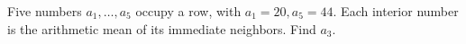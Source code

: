 Five numbers $a_1,\ldots,a_5$ occupy a row, with $a_1=20,a_5=44$. Each interior number is the arithmetic mean of its immediate neighbors. Find $a_3$.
